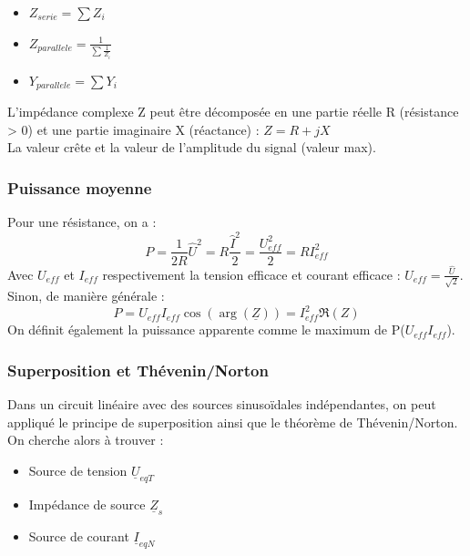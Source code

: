 \documentclass[../main.tex]{subfiles}
\begin{document}
\begin{itemize}
    \item $Z_{serie} = \sum Z_i$\\
    \item $Z_{parallele} = \frac{1}{\sum \frac{1}{Z_i}}$\\
    \item $Y_{parallele} = \sum Y_i$\\
\end{itemize}

L'impédance complexe Z peut être décomposée en une partie réelle R (résistance > 0) et une partie imaginaire X (réactance) : $Z = R+jX$\\

La valeur crête et la valeur de l'amplitude du signal (valeur max).\\

\subsubsection{Puissance moyenne}
Pour une résistance, on a :
\begin{equation}
    P = \frac{1}{2R} \hat{U}^2 = R\frac{\hat{I}^2}{2} = \frac{U_{eff}^2}{2} = RI_{eff}^2
\end{equation}
Avec $U_{eff}$ et $I_{eff}$ respectivement la tension efficace et courant efficace : $U_{eff} = \frac{\hat{U}}{\sqrt{2}}$.\\

Sinon, de manière générale : \begin{equation}
    P = U_{eff} I_{eff} \cos(\arg(\underline{Z})) = I_{eff}^2 \Re(Z)
\end{equation}
On définit également la puissance apparente comme le maximum de P($U_{eff} I_{eff}$).\\

\subsubsection{Superposition et Thévenin/Norton}
Dans un circuit linéaire avec des sources sinusoïdales indépendantes, on peut appliqué le principe de superposition ainsi que le théorème de Thévenin/Norton. On cherche alors à trouver : \begin{itemize}
    \item Source de tension $\underline{U}_{eqT}$\\
    \item Impédance de source $\underline{Z}_s$\\
    \item Source de courant $\underline{I}_{eqN}$\\
\end{itemize}
\end{document}
